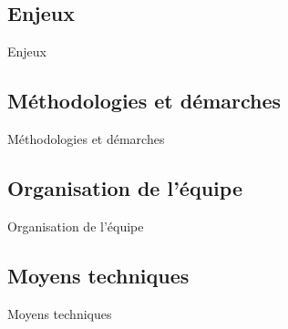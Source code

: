 \subsection{Enjeux}
\JulianSpeak
\begin{frame}{Enjeux}
\end{frame}
\subsection{Méthodologies et démarches}
\begin{frame}{Méthodologies et démarches}
\end{frame}
\SteveSpeak
\subsection{Organisation de l'équipe}
\begin{frame}{Organisation de l'équipe}
\end{frame}
\subsection{Moyens techniques}
\begin{frame}{Moyens techniques}
\end{frame}